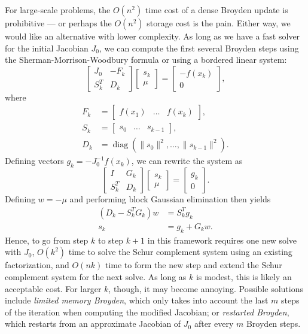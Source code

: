 \documentclass[12pt, leqno]{article} %
\begin{document}
For large-scale problems, the $O(n^2)$ time cost of a dense Broyden
update is prohibitive --- or perhaps the $O(n^2)$ storage cost is the
pain.  Either way, we would like an alternative with lower complexity.
As long as we have a fast solver for the initial Jacobian $J_0$, we
can compute the first several Broyden steps using the
Sherman-Morrison-Woodbury formula or using a bordered linear system:
\[
  \begin{bmatrix}
    J_0 & -F_k \\
    S_k^T & D_k
  \end{bmatrix}
  \begin{bmatrix} s_{k} \\ \mu \end{bmatrix} =
  \begin{bmatrix} -f(x_k) \\ 0 \end{bmatrix},
\]
where
\begin{align*}
  F_k &= \begin{bmatrix} f(x_1) & \ldots & f(x_k) \end{bmatrix}, \\
  S_k &= \begin{bmatrix} s_0 & \ldots & s_{k-1} \end{bmatrix}, \\
  D_k &= \operatorname{diag}\left( \|s_0\|^2, \ldots, \|s_{k-1}\|^2 \right).
\end{align*}
Defining vectors $g_k = -J_0^{-1} f(x_k)$, we can rewrite the system
as
\[
  \begin{bmatrix}
    I     & G_k \\
    S_k^T & D_k
  \end{bmatrix}
  \begin{bmatrix} s_{k} \\ \mu \end{bmatrix} =
  \begin{bmatrix} g_k \\ 0 \end{bmatrix}.
\]
Defining $w = -\mu$ and performing block Gaussian elimination then yields
\begin{align*}
  (D_k - S_k^T G_k) w &= S_k^T g_k \\
  s_k &= g_k + G_k w.
\end{align*}
Hence, to go from step $k$ to step $k+1$ in this framework requires
one new solve with $J_0$, $O(k^2)$ time to solve the Schur complement
system using an existing factorization, and $O(nk)$ time to form the
new step and extend the Schur complement system for the next solve.
As long as $k$ is modest, this is likely an acceptable cost.  For
larger $k$, though, it may become annoying.  Possible solutions
include {\em limited memory Broyden}, which only takes into account
the last $m$ steps of the iteration when computing the modified
Jacobian; or {\em restarted Broyden}, which restarts from an
approximate Jacobian of $J_0$ after every $m$ Broyden steps.
\end{document}
